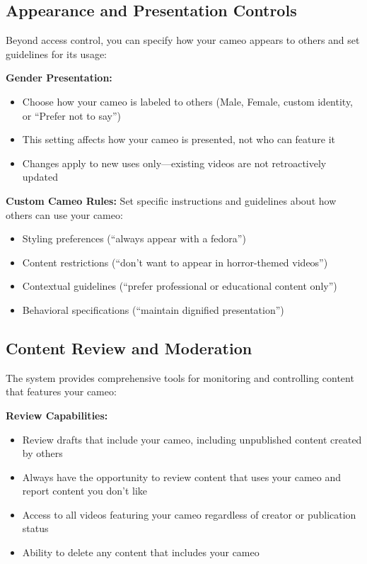 \subsection{Appearance and Presentation Controls}

Beyond access control, you can specify how your cameo appears to others and set guidelines for its usage:

\textbf{Gender Presentation:}
\begin{itemize}
\item Choose how your cameo is labeled to others (Male, Female, custom identity, or ``Prefer not to say'')
\item This setting affects how your cameo is presented, not who can feature it
\item Changes apply to new uses only—existing videos are not retroactively updated
\end{itemize}

\textbf{Custom Cameo Rules:}
Set specific instructions and guidelines about how others can use your cameo:
\begin{itemize}
\item Styling preferences (``always appear with a fedora'')
\item Content restrictions (``don't want to appear in horror-themed videos'')
\item Contextual guidelines (``prefer professional or educational content only'')
\item Behavioral specifications (``maintain dignified presentation'')
\end{itemize}

\subsection{Content Review and Moderation}

The system provides comprehensive tools for monitoring and controlling content that features your cameo:

\textbf{Review Capabilities:}
\begin{itemize}
\item Review drafts that include your cameo, including unpublished content created by others
\item Always have the opportunity to review content that uses your cameo and report content you don't like
\item Access to all videos featuring your cameo regardless of creator or publication status
\item Ability to delete any content that includes your cameo
\end{itemize}

